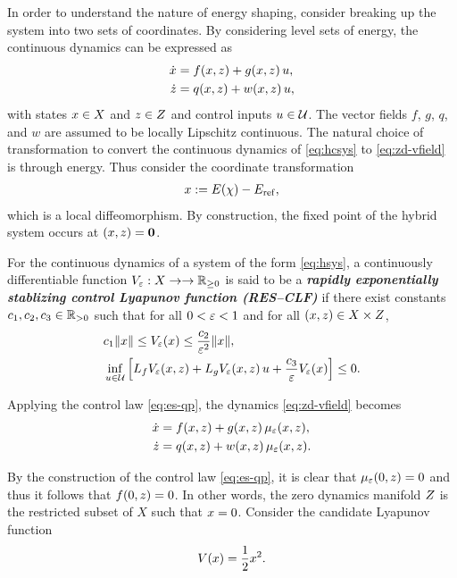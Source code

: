 \documentclass[twocolumn]{article}
\begin{document}
In order to understand the nature of energy shaping, consider breaking up the system into two sets of coordinates.
%
By considering level sets of energy, the continuous dynamics can be expressed as
\begin{align}
  \nonumber
  \dot {x} &= f(x, z) + g(x, z) \, u,\\
  \dot {z} &= q(x, z) + w(x, z) \, u,
  \label{eq:zd-vfield}
\end{align}
%
with states $x \in X$ and $z \in Z$ and control inputs $u \in \mathcal{U}$.
%
The vector fields $f$, $g$, $q$, and $w$ are assumed to be locally Lipschitz continuous.
%
The natural choice of transformation to convert the continuous dynamics of \eqref{eq:hcsys} to \eqref{eq:zd-vfield} is through energy.
%
Thus consider the coordinate transformation
\begin{align}
  x := E(\chi) - E_{\mathrm{ref}},
\end{align}
which is a local diffeomorphism.
%
By construction, the fixed point of the hybrid system occurs at $(x, z) = {\mathbf 0}$.
%

\begin{definition}
  For the continuous dynamics of a system of the form \eqref{eq:hsys}, a continuously differentiable function $V_{\varepsilon} : X \to \to \mathbb{R}_{\geq 0}$ is said to be a {\bf \em rapidly exponentially stablizing control Lyapunov function (RES--CLF)} if there exist constants $c_{1}, c_{2}, c_{3} \in \mathbb{R}_{> 0}$ such that for all $0 < \varepsilon < 1$ and for all $(x, z) \in X \times Z$,
  \begin{align}
    &c_{1} \| x \| \leq V_{\varepsilon}(x) \leq \frac{c_{2}}{\varepsilon^{2}} \| x \|,\\
    \nonumber
    &\inf_{u \in \mathcal{U}} \left[ L_{f} V_{\varepsilon}(x, z) + L_{g} V_{\varepsilon}(x, z) \, u + \frac{c_{3}}{\varepsilon} V_{\varepsilon}(x) \right] \leq 0.
  \end{align}
\end{definition}


Applying the control law \eqref{eq:es-qp}, the dynamics \eqref{eq:zd-vfield} becomes
\begin{align}
  \nonumber
  \dot {x} &= f(x, z) + g(x, z) \, \mu_{\varepsilon}(x, z),\\
  \dot {z} &= q(x, z) + w(x, z) \, \mu_{\varepsilon}(x, z).
  \label{eq:zd-vfield-cl}
\end{align}

By the construction of the control law \eqref{eq:es-qp}, it is clear that $\mu_{\varepsilon}(0, z) = 0$ and thus it follows that $f(0, z) = 0$.
%
In other words, the zero dynamics manifold $Z$ is the restricted subset of $X$ such that $x = 0$.
%
Consider the candidate Lyapunov function
\begin{align}
  V(x) = \frac{1}{2} x^{2}.
\end{align}
\end{document}
